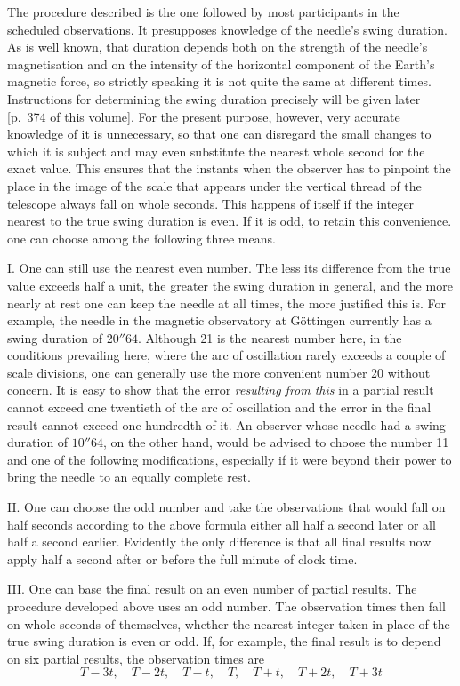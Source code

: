 The procedure described is the one followed by most participants in the scheduled observations. It presupposes knowledge of the needle’s swing duration. As is well known, that duration depends both on the strength of the needle’s
magnetisation and on the intensity of the horizontal component of the Earth’s magnetic force, so strictly speaking it is not quite the same at different times. Instructions for determining the swing duration precisely will be given later [p.~374 of this volume]. For the present purpose, however, very accurate knowledge of it is unnecessary, so that one can disregard the small changes to which it is subject and may even substitute the nearest whole second for the exact value. This ensures that the instants when the observer has to pinpoint the place in the image of the scale that appears under the vertical thread of the telescope always fall on whole seconds. This happens of itself if the integer nearest to the true swing duration is even. If it is odd, to retain this convenience. one can choose among the following three means.

I. One can still use the nearest even number. The less its difference from the true value exceeds half a unit, the greater the swing duration in general, and the more nearly at rest one can keep the needle at all times, the more justified this is. For example, the needle in the magnetic observatory at Göttingen currently has a swing duration of $20''64$. Although 21 is the nearest number here, in the conditions prevailing here, where the arc of oscillation rarely exceeds a couple of scale divisions, one can generally use the more convenient number 20 without concern. It is easy to show that the error \textit{resulting from this} in a partial result cannot exceed one twentieth of the arc of oscillation and the error in the final result cannot exceed one hundredth of it. An observer whose needle had a swing duration of $10''64$, on the other hand, would be advised to choose the number 11 and one of the following modifications, especially if it were beyond their power to bring the needle to an equally complete rest.

II. One can choose the odd number and take the observations that would fall on half seconds according to the above formula either all half a second later or all half a second earlier. Evidently the only difference is that all final results now apply half a second after or before the full minute of clock time.

III. One can base the final result on an even number of partial results. The procedure developed above uses an odd number. The observation times then fall on whole seconds of themselves, whether the nearest integer taken in place of the true swing duration is even or odd. If, for example, the final result is to depend on six partial results, the observation times are
\[
T-3t,\quad T-2t,\quad T-t,\quad T,\quad T+t,\quad T+2t,\quad T+3t
\]

